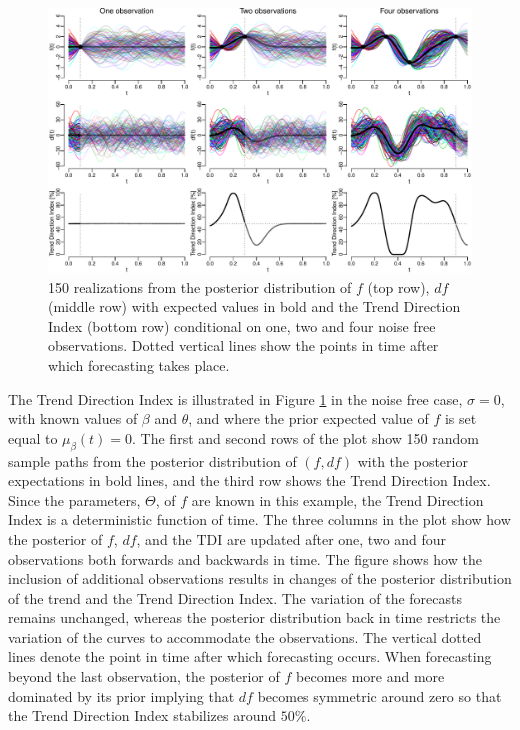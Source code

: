 \documentclass[11pt,]{article}
\theoremstyle{nonumberplain}
\begin{document}
\begin{figure}[htb]
\center\includegraphics{TDIexample}
\caption{150 realizations from the posterior distribution of $f$ (top row), $df$ (middle row) with expected values in bold and the Trend Direction Index (bottom row) conditional on one, two and four noise free observations. Dotted vertical lines show the points in time after which forecasting takes place.}
\label{fig:probabilisticExample}
\end{figure}

The Trend Direction Index is illustrated in Figure
\ref{fig:probabilisticExample} in the noise free case, \(\sigma = 0\),
with known values of \(\beta\) and \(\theta\), and where the prior
expected value of \(f\) is set equal to \(\mu_{\beta}(t) = 0\). The
first and second rows of the plot show 150 random sample paths from the
posterior distribution of \((f, df)\) with the posterior expectations in
bold lines, and the third row shows the Trend Direction Index. Since the
parameters, \(\Theta\), of \(f\) are known in this example, the Trend
Direction Index is a deterministic function of time. The three columns
in the plot show how the posterior of \(f\), \(df\), and the
\(\mathrm{TDI}\) are updated after one, two and four observations both
forwards and backwards in time. The figure shows how the inclusion of
additional observations results in changes of the posterior distribution
of the trend and the Trend Direction Index. The variation of the
forecasts remains unchanged, whereas the posterior distribution back in
time restricts the variation of the curves to accommodate the
observations. The vertical dotted lines denote the point in time after
which forecasting occurs. When forecasting beyond the last observation,
the posterior of \(f\) becomes more and more dominated by its prior
implying that \(df\) becomes symmetric around zero so that the Trend
Direction Index stabilizes around \(50\%\).
\end{document}
